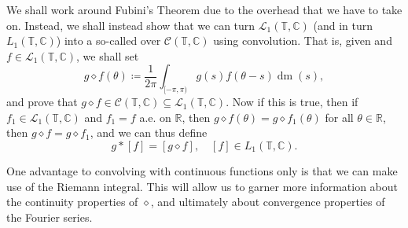\documentclass[notoc,notitlepage]{tufte-book}
\DeclareMathOperator{\dm}{dm}
\begin{document}
We shall work around Fubini's Theorem due to the overhead
that we have to take on.
Instead, we shall instead show that we can turn $\mathcal{L}_1(\mathbb{T}, \mathbb{C})$
(and in turn $L_1(\mathbb{T}, \mathbb{C})$) into a so-called
 over $\mathcal{C}(\mathbb{T}, \mathbb{C})$
using convolution.
That is, given  and
$f \in \mathcal{L}_1(\mathbb{T}, \mathbb{C})$, we shall set
\begin{equation*}
  g \diamond f(\theta) \coloneqq \frac{1}{2 \pi} \int_{[-\pi, \pi)} g(s)f(\theta
  - s) \dm(s),
\end{equation*}
and prove that $g \diamond f \in \mathcal{C}(\mathbb{T}, \mathbb{C}) \subseteq
\mathcal{L}_1(\mathbb{T}, \mathbb{C})$.
Now if this is true, then if $f_1 \in \mathcal{L}_1(\mathbb{T}, \mathbb{C})$
and $f_1 = f$ a.e. on $\mathbb{R}$,
then $g \diamond f(\theta) = g \diamond f_1(\theta)$ for all $\theta \in \mathbb{R}$,
then $g \diamond f = g \diamond f_1$,
and we can thus define
\begin{equation*}
  g * [f] = [g \diamond f], \quad [f] \in L_1(\mathbb{T}, \mathbb{C}).
\end{equation*}

One advantage to convolving with continuous functions only
is that we can make use of the Riemann integral.
This will allow us to garner more information about the
continuity properties of $\diamond$,
and ultimately about convergence properties of the Fourier series.
\end{document}
